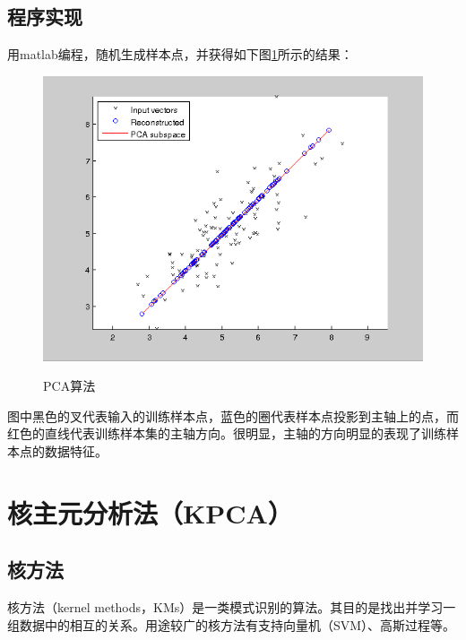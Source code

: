 \documentclass[12pt,a4paper,CJK]{beamer}
\begin{document}
\begin{CJK*}{UTF8}{gkai}
\begin{frame}{\subsecname}
\end{frame}


\subsection{程序实现}
\begin{frame}{\subsecname}
用matlab编程，随机生成样本点，并获得如下图\ref{fig:pca}所示的结果：
\begin{figure}[!htbp]
	\centering
	\caption{PCA算法}  
		\includegraphics[scale=0.55]{figs/pca.png}
    	\label{fig:pca}
\end{figure}
图中黑色的叉代表输入的训练样本点，蓝色的圈代表样本点投影到主轴上的点，而红色的直线代表训练样本集的主轴方向。很明显，主轴的方向明显的表现了训练样本点的数据特征。

\end{frame}



\section{核主元分析法（KPCA）}
\subsection{核方法}
\begin{frame}{\subsecname}
核方法（kernel methods，KMs）是一类模式识别的算法。其目的是找出并学习一组数据中的相互的关系。用途较广的核方法有支持向量机（SVM）、高斯过程等。


\end{frame}
\end{CJK*}
\end{document}
